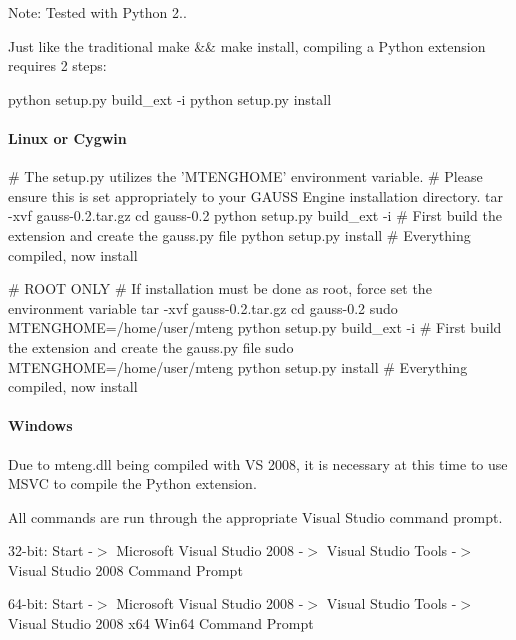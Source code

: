Note\-: Tested with Python 2..

Just like the traditional {\ttfamily make \&\& make install}, compiling a Python extension requires 2 steps\-:


\begin{DoxyCode}
python setup.py build\_ext -i
python setup.py install
\end{DoxyCode}


\paragraph*{Linux or Cygwin}


\begin{DoxyCode}
\textcolor{preprocessor}{# The setup.py utilizes the 'MTENGHOME' environment variable.}
\textcolor{preprocessor}{}\textcolor{preprocessor}{# Please ensure this is set appropriately to your GAUSS Engine installation directory.}
\textcolor{preprocessor}{}tar -xvf gauss-0.2.tar.gz
cd gauss-0.2
python setup.py build\_ext -i      # First build the extension and create the gauss.py file
python setup.py install           # Everything compiled, now install

\textcolor{preprocessor}{# ROOT ONLY}
\textcolor{preprocessor}{}\textcolor{preprocessor}{# If installation must be done as root, force set the environment variable}
\textcolor{preprocessor}{}tar -xvf gauss-0.2.tar.gz
cd gauss-0.2
sudo MTENGHOME=/home/user/mteng python setup.py build\_ext -i # First build the extension and create the 
      gauss.py file
sudo MTENGHOME=/home/user/mteng python setup.py install      # Everything compiled, now install
\end{DoxyCode}


\paragraph*{Windows}

Due to {\ttfamily mteng.\-dll} being compiled with V\-S 2008, it is necessary at this time to use M\-S\-V\-C to compile the Python extension.

All commands are run through the appropriate Visual Studio command prompt.

32-\/bit\-: {\ttfamily Start -\/$>$ Microsoft Visual Studio 2008 -\/$>$ Visual Studio Tools -\/$>$ Visual Studio 2008 Command Prompt}

64-\/bit\-: {\ttfamily Start -\/$>$ Microsoft Visual Studio 2008 -\/$>$ Visual Studio Tools -\/$>$ Visual Studio 2008 x64 Win64 Command Prompt}

